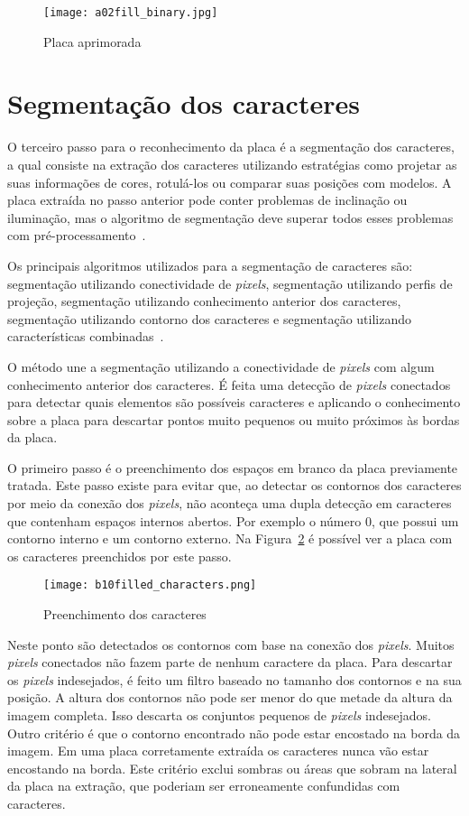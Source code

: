 \begin{figure}[H]
	\centering
	\texttt{[image: a02fill\_binary.jpg]}
	\caption{Placa aprimorada}
	\label{fig:ext_enhanced_number_plate}
\end{figure}

\section{Segmentação dos caracteres}
\label{sec:segmentacao}

O terceiro passo para o reconhecimento da placa é a segmentação dos caracteres, a qual consiste na extração dos caracteres utilizando
estratégias como projetar as suas informações de cores, rotulá-los ou comparar suas posições com modelos. A placa extraída no passo anterior pode conter
problemas de inclinação ou iluminação, mas o algoritmo de segmentação deve
superar todos esses problemas com pré-processamento~\cite{s2013automatic}.

Os principais algoritmos utilizados para a segmentação de caracteres são: segmentação utilizando conectividade de \emph{pixels}, segmentação utilizando perfis de projeção, segmentação utilizando conhecimento anterior dos caracteres, segmentação utilizando contorno dos caracteres e segmentação utilizando características combinadas~\cite{s2013automatic}.

O método une a segmentação utilizando a conectividade de \emph{pixels} com algum conhecimento anterior dos caracteres. É feita uma detecção de \emph{pixels} conectados para detectar quais elementos são possíveis caracteres e aplicando o conhecimento sobre a placa para descartar pontos muito pequenos ou muito próximos às bordas da placa.

O primeiro passo é o preenchimento dos espaços em branco da placa previamente tratada. Este passo existe para evitar que, ao detectar os contornos dos caracteres por meio da conexão dos \emph{pixels}, não aconteça uma dupla detecção em caracteres que contenham espaços internos abertos. Por exemplo o número 0, que possui um contorno interno e um contorno externo. Na Figura~\ref{fig:preenchimento} é possível ver a placa com os caracteres preenchidos por este passo.

\begin{figure}[H]
	\centering
	\texttt{[image: b10filled\_characters.png]}
	\caption{Preenchimento dos caracteres}
	\label{fig:preenchimento}
\end{figure}

Neste ponto são detectados os contornos com base na conexão dos \emph{pixels}. Muitos \emph{pixels} conectados não fazem parte de nenhum caractere da placa. Para descartar os \emph{pixels} indesejados, é feito um filtro baseado no tamanho dos contornos e na sua posição. A altura dos contornos não pode ser menor do que metade da altura da imagem completa. Isso descarta os conjuntos pequenos de \emph{pixels} indesejados. Outro critério é que o contorno encontrado não pode estar encostado na borda da imagem. Em uma placa corretamente extraída os caracteres nunca vão estar encostando na borda. Este critério exclui sombras ou áreas que sobram na lateral da placa na extração, que poderiam ser erroneamente confundidas com caracteres.

